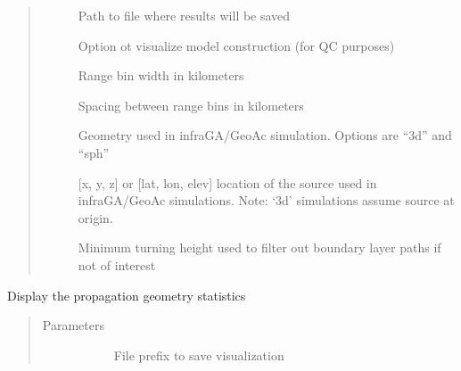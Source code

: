 \documentclass[letterpaper,10pt,english]{sphinxmanual}
\begin{document}
\begin{fulllineitems}
\begin{fulllineitems}
\begin{quote}
\begin{description}
\begin{description}
\item[{}] \leavevmode
Path to file where results will be saved

\item[{}] \leavevmode
Option ot visualize model construction (for QC purposes)

\item[{}] \leavevmode
Range bin width in kilometers

\item[{}] \leavevmode
Spacing between range bins in kilometers

\item[{}] \leavevmode
Geometry used in infraGA/GeoAc simulation.  Options are “3d” and “sph”

\item[{}] \leavevmode
{[}x, y, z{]} or {[}lat, lon, elev{]} location of the source used in infraGA/GeoAc simulations.  Note: ‘3d’ simulations assume source at origin.

\item[{}] \leavevmode
Minimum turning height used to filter out boundary layer paths if not of interest

\end{description}

\end{description}\end{quote}

\end{fulllineitems}


\begin{fulllineitems}
\label{\detokenize{stochprop.propagation:stochprop.propagation.PathGeometryModel.display}}
Display the propagation geometry statistics
\begin{quote}\begin{description}
\item[{Parameters}] \leavevmode\begin{description}
\item[{}] \leavevmode
File prefix to save visualization


\end{description}
\end{description}
\end{quote}
\end{fulllineitems}
\end{fulllineitems}
\end{document}
